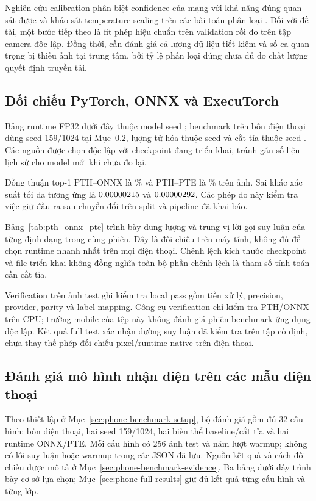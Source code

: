 Nghiên cứu calibration phân biệt confidence của mạng với khả năng đúng quan sát được và khảo sát temperature scaling trên các bài toán phân loại \citep{guo2017calibration}. Đối với đề tài, một bước tiếp theo là fit phép hiệu chuẩn trên validation rồi đo trên tập camera độc lập. Đồng thời, cần đánh giá cả lượng dữ liệu tiết kiệm và số ca quan trọng bị thiếu ảnh tại trung tâm, bởi tỷ lệ phân loại đúng chưa đủ đo chất lượng quyết định truyền tải.

\subsection{Đối chiếu PyTorch, ONNX và ExecuTorch}
Bảng runtime FP32 dưới đây thuộc model seed \BenchmarkSeed{}; benchmark trên bốn điện thoại dùng seed 159/1024 tại Mục~\ref{sec:phone-benchmark-results}, lượng tử hóa thuộc seed \QuantizationSeed{} và cắt tỉa thuộc seed \PruningSeed{}. Các nguồn được chọn độc lập với checkpoint đang triển khai, tránh gán số liệu lịch sử cho model mới khi chưa đo lại.



Đồng thuận top-1 PTH--ONNX là \CpuOnnxAgreement\% và PTH--PTE là \CpuPteAgreement\% trên \ImageTest{} ảnh. Sai khác xác suất tối đa tương ứng là $0.00000215$ và $0.00000292$. Các phép đo này kiểm tra việc giữ đầu ra sau chuyển đổi trên split và pipeline đã khai báo.

Bảng~\ref{tab:pth_onnx_pte} trình bày dung lượng và trung vị lời gọi suy luận của từng định dạng trong cùng phiên. Đây là đối chiếu trên máy tính, không đủ để chọn runtime nhanh nhất trên mọi điện thoại. Chênh lệch kích thước checkpoint và file triển khai không đồng nghĩa toàn bộ phần chênh lệch là tham số tính toán cần cắt tỉa.

Verification trên \VerificationSamples{} ảnh test ghi \VerificationPassedChecks{} kiểm tra local pass gồm tiền xử lý, precision, provider, parity và label mapping. Công cụ verification chỉ kiểm tra PTH/ONNX trên CPU; trường mobile của tệp này không đánh giá phiên benchmark ứng dụng độc lập. Kết quả full test xác nhận đường suy luận đã kiểm tra trên tập cố định, chưa thay thế phép đối chiếu pixel/runtime native trên điện thoại.

\subsection{Đánh giá mô hình nhận diện trên các mẫu điện thoại}\label{sec:phone-benchmark-results}
Theo thiết lập ở Mục~\ref{sec:phone-benchmark-setup}, bộ đánh giá gồm đủ 32 cấu hình: bốn điện thoại, hai seed 159/1024, hai biến thể baseline/cắt tỉa và hai runtime ONNX/PTE. Mỗi cấu hình có 256 ảnh test và năm lượt warmup; không có lỗi suy luận hoặc warmup trong các JSON đã lưu. Nguồn kết quả và cách đối chiếu được mô tả ở Mục~\ref{sec:phone-benchmark-evidence}. Ba bảng dưới đây trình bày cơ sở lựa chọn; Mục~\ref{sec:phone-full-results} giữ đủ kết quả từng cấu hình và từng lớp.

